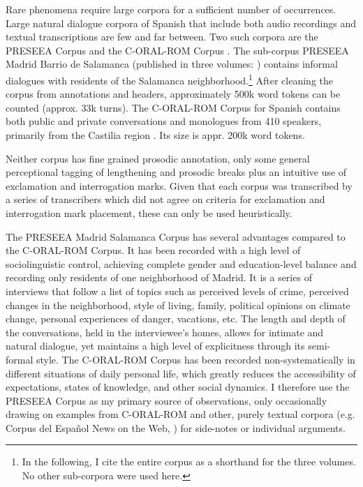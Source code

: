 Rare phenomena require large corpora for a sufficient number of occurrences. Large natural dialogue corpora of Spanish that include both audio recordings and textual transcriptions are few and far between. Two such corpora are the PRESEEA Corpus \citep{PRESEEA.20142020} and the C-ORAL-ROM Corpus \citep{CrestiMoneglia.2005}. The sub-corpus PRESEEA Madrid Barrio de Salamanca (published in three volumes: \cite{CesteroManceraMolinaMartosParedesGarcia.2012,MolinaMartosParedesGarciaCesteroMancera.2014,ParedesGarciaCesteroManceraMolinaMartos.2015}) contains informal dialogues with residents of the Salamanca neighborhood.\footnote{In the following, I cite the entire corpus \citep{PRESEEA.20142020} as a shorthand for the three volumes. No other sub-corpora were used here.} After cleaning the corpus from annotations and headers, approximately 500k word tokens can be counted (approx. 33k turns). The C-ORAL-ROM Corpus for Spanish contains both public and private conversations and monologues from 410 spea\-kers, primarily from the Castilia region \citep[9]{CrestiMoneglia.2005}. Its size is appr. 200k word tokens. 

Neither corpus has fine grained prosodic annotation, only some general perceptional tagging of lengthening and prosodic breaks plus an intuitive use of exclamation and interrogation marks. Given that each corpus was transcribed by a series of transcribers which did not agree on criteria for exclamation and interrogation mark placement, these can only be used heuristically.

The PRESEEA Madrid Salamanca Corpus has several advantages compared to the C-ORAL-ROM Corpus. It has been recorded with a high level of sociolinguistic control, achieving complete gender and education-level balance and recording only residents of one neighborhood of Madrid. It is a series of interviews that follow a list of topics such as perceived levels of crime, perceived changes in the neighborhood, style of living, family, political opinions on climate change, personal experiences of danger, vacations, etc. The length and depth of the conversations, held in the interviewee's homes, allows for intimate and natural dialogue, yet maintains a high level of explicitness through its semi-formal style. The C-ORAL-ROM Corpus has been recorded non-systematically in different situations of daily personal life, which greatly reduces the accessibility of expectations, states of knowledge, and other social dynamics. I therefore use the PRESEEA Corpus as my primary source of observations, only occasionally drawing on examples from C-ORAL-ROM and other, purely textual corpora (e.g. Corpus del Español News on the Web, \citealt{Davies.20122019}) for side-notes or individual arguments.

